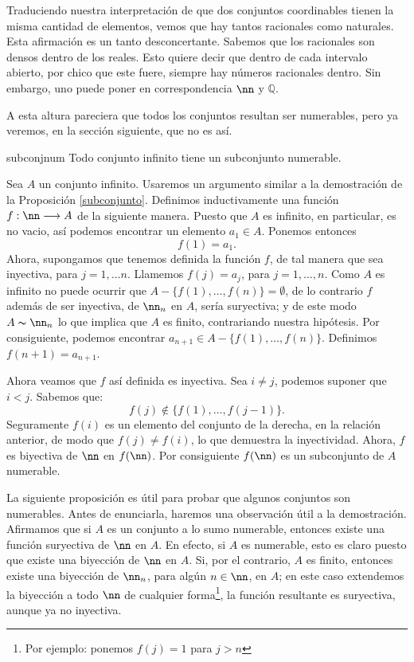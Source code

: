 Traduciendo nuestra interpretación de que dos conjuntos
coordinables tienen la misma cantidad de elementos, vemos que hay
tantos racionales como naturales. Esta afirmación es un tanto
desconcertante. Sabemos que los racionales son
densos dentro de los reales. Esto quiere decir que dentro de cada
intervalo abierto, por chico que este fuere, siempre hay números
racionales dentro. Sin embargo, uno puede poner en correspondencia
$\nn$ y $\mathbb{Q}$.  

A esta altura pareciera que
todos los conjuntos resultan ser numerables, pero ya veremos, en
la sección siguiente, que no es así.


\begin{lema}{subconjnum} Todo conjunto infinito tiene un
subconjunto numerable.
\end{lema}

\begin{demo} Sea $A$ un conjunto infinito. Usaremos un argumento similar a la demostración de
la Proposición \vref{subconjunto}. Definimos inductivamente una
función $f:\nn\longrightarrow A$  de la siguiente manera. Puesto
que $A$ es infinito, en particular, es no vacio, así podemos
encontrar un elemento $a_1\in A$. Ponemos entonces
\[f(1)=a_1.\]
Ahora, supongamos que tenemos definida la función $f$, de tal
manera que sea inyectiva, para $j=1,\dots n$. Llamemos $f(j)=a_j$,
para $j=1,\dots , n$. Como $A$ es infinito no puede ocurrir que
$A-\{f(1),\dots,f(n)\}=\emptyset$, de lo contrario $f$ además de
ser inyectiva, de $\nn_n$ en $A$, sería suryectiva; y de este
modo $A\thicksim\nn_n$ lo que implica que $A$ es finito,
contrariando nuestra hipótesis. Por consiguiente, podemos
encontrar $a_{n+1}\in A-\{f(1),\dots,f(n)\}$. Definimos
$f(n+1)=a_{n+1}$.

Ahora veamos que $f$ así definida es inyectiva. Sea $i\neq
j $, podemos suponer que $i<j$. Sabemos que:
\[f(j)\notin \{f(1),\dots,f(j-1)\}.\]
Seguramente $f(i)$ es un elemento del conjunto de la derecha, en
la relación anterior, de modo que $f(j)\neq f(i)$, lo que
demuestra la inyectividad. Ahora, $f$ es biyectiva de $\nn$ en
$f(\nn)$. Por consiguiente $f(\nn)$ es un subconjunto de $A$
numerable. 
\end{demo}

La siguiente proposición es útil para probar que algunos
conjuntos son numerables. Antes de enunciarla, haremos una
observación útil a la demostración. Afirmamos que si $A$ es
un conjunto a lo sumo numerable, entonces existe una función
suryectiva de $\nn$ en $A$. En efecto, si $A$ es numerable, esto
es claro puesto que existe una biyección de $\nn$ en $A$. Si,
por el contrario, $A$ es finito, entonces existe una biyección
de $\nn_n$, para algún $n\in\nn$, en $A$; en este caso
extendemos la biyección a todo $\nn$ de cualquier
forma\footnote{Por ejemplo: ponemos $f(j)=1$ para $j>n$}, la
función resultante es suryectiva, aunque ya no inyectiva.

